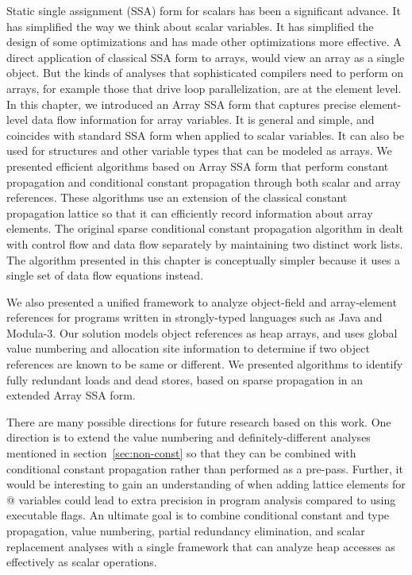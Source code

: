 Static single assignment (SSA) form for scalars has been a significant
advance. It has simplified the way we think about scalar variables.
It has simplified the design of some optimizations and has made other
optimizations more effective. A direct application of classical SSA form to
arrays, would 
view an array as a single object.  But the kinds of analyses that
sophisticated compilers need to perform on
arrays, for example those that drive loop parallelization, are at the
element level.  
In this chapter, we introduced an Array SSA form that captures precise
element-level data flow information for array variables. It is general and simple, and coincides with standard SSA form
when applied to scalar variables.  It can also be used for structures
and other variable types that can be modeled as arrays.  
We presented efficient algorithms based on Array SSA form that perform
constant propagation and
conditional constant propagation through both
scalar and array references.
These algorithms use an extension of the classical constant
propagation lattice so that it can efficiently record information
about array elements.  
The original sparse conditional constant propagation algorithm in
\cite{WeZa91} dealt with control flow and data flow separately by
maintaining two distinct work lists.  The algorithm presented in this chapter
is conceptually simpler because it uses a single set
of data flow equations instead. 

We also presented a unified framework to analyze
object-field and array-element references for programs written in
strongly-typed languages such as Java and Modula-3.  Our solution
models object references as heap
arrays, and uses global value numbering and allocation site
information to determine if two object references are known to be same
or different.  We presented algorithms to identify fully redundant
loads and dead stores, based on sparse propagation in an extended Array SSA
form.

There are many possible directions for future research based on this work.
One direction is to extend the value numbering and 
definitely-different analyses mentioned in section~\ref{sec:non-const}
so that they can be combined with conditional constant propagation
rather than performed as a pre-pass.
Further, it would be interesting 
to gain an understanding of when
adding lattice elements for @ variables could lead to 
extra precision in program analysis 
compared to using executable flags.
An ultimate goal is
to combine conditional constant and type propagation, value numbering, partial redundancy elimination,
and scalar replacement analyses with a single framework that can
analyze heap accesses as effectively as scalar operations.
